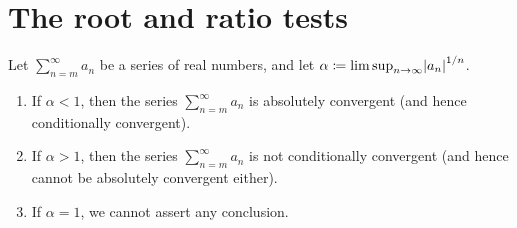 \section{The root and ratio tests}\label{sec 7.5}

\begin{theorem}\label{7.5.1}
    Let \(\sum_{n = m}^\infty a_n\) be a series of real numbers, and let \(\alpha \coloneqq \lim\sup_{n \to \infty} \abs*{a_n}^{1 / n}\).
    \begin{enumerate}
        \item If \(\alpha < 1\), then the series \(\sum_{n = m}^\infty a_n\) is absolutely convergent
              (and hence conditionally convergent).
        \item If \(\alpha > 1\), then the series \(\sum_{n = m}^\infty a_n\) is not conditionally convergent
              (and hence cannot be absolutely convergent either).
        \item If \(\alpha = 1\), we cannot assert any conclusion.
    \end{enumerate}
\end{theorem}

